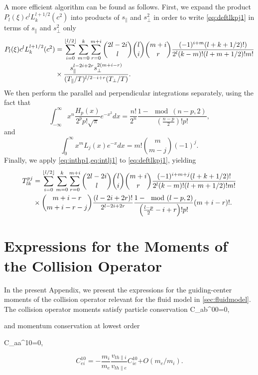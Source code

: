 A more efficient algorithm can be found as follows.
%
First, we expand the product $P_l(\xi)c^l L_k^{l+1/2}(c^2)$ into products of $s_\parallel$ and $s_\perp^2$ in order to write \cref{eq:deftlkpj1} in terms of $s_\parallel$ and $s_\perp^2$ only
%
\begin{align}
    P_l(\xi)c^l L_k^{l+1/2}(c^2)&=\sum_{i=0}^{\lfloor l/2\rfloor}\sum_{m=0}^k\sum_{r=0}^{m+i}\binom{2l-2i}{l}\binom{l}{i}\binom{m+i}{r}\frac{(-1)^{i+m}(l+k+1/2)!)}{2^l(k-m)!(l+m+1/2)!m!}\nonumber\\
    &\times\frac{s_\parallel^{l-2i+2r}s_\perp^{2(m+i-r)}}{(T_\parallel/T)^{l/2-i+r}(T_\perp/T)}.
\end{align}
%
We then perform the parallel and perpendicular integrations separately, using the fact that
%
\begin{equation}
    \int_{-\infty}^{\infty} x^n \frac{H_p(x)}{2^p p! \sqrt{\pi}}e^{-x^2}dx=\frac{n!}{2^n}\frac{1-\mod(n-p,2)}{\left(\frac{n-p}{2}\right)!p!},
\label{eq:inthp1}
\end{equation}
%
and
%
\begin{equation}
        \int_0^{\infty} x^m L_j(x) e^{-x}dx = m!\binom{m}{m-j}(-1)^j.
\label{eq:intlj1}
\end{equation}
%
Finally, we apply \cref{eq:inthp1,eq:intlj1} to \cref{eq:deftlkpj1}, yielding
%
\begin{align}
    T_{lk}^{pj}&=\sum_{i=0}^{\lfloor l/2\rfloor}\sum_{m=0}^k\sum_{r=0}^{m+i}\binom{2l-2i}{l}\binom{l}{i}\binom{m+i}{r}\frac{(-1)^{i+m+j}(l+k+1/2)!}{2^l(k-m)!(l+m+1/2)!m!}\nonumber\\
    &\times\binom{m+i-r}{m+i-r-j}\frac{(l-2i+2r)!}{2^{l-2i+2r}}\frac{1-\mod(l-p,2)}{\left(\frac{l-p}{2}-i+r\right)!p!}(m+i-r)!.
\end{align}

\chapter{Expressions for the Moments of the Collision Operator}
\label{app:cabmoments}

In the present Appendix, we present the expressions for the guiding-center moments of the collision operator relevant for the fluid model in \cref{sec:fluidmodel}.
The collision operator moments satisfy particle conservation
\be
    C_{ab}^{00}=0,
\ee

\noindent and momentum conservation {at lowest order}

\be
    C_{aa}^{10}=0,
\ee

\begin{equation}
    C_{ei}^{10}=-\frac{m_i}{m_e}\frac{v_{th\parallel i}}{v_{th \parallel e}}C_{ie}^{10}{+O({m_e/m_i})}.
\end{equation}

